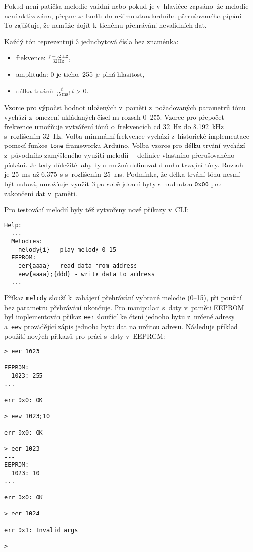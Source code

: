 Pokud není patička melodie validní nebo pokud je v~hlavičce zapsáno, že melodie
není aktivována, přepne se budík do režimu standardního přerušovaného pípání.
To zajišťuje, že nemůže dojít k~tichému přehrávání nevalidních dat.

Každý tón reprezentují 3 jednobytová čísla bez znaménka:
\begin{itemize}[nosep]
    \item frekvence: $\frac{f - \SI{32}{\hertz}}{\SI{32}{\hertz}}$,
    \item amplituda: \num{0} je ticho, \num{255} je plná hlasitost,
    \item délka trvání: $\frac{t}{\SI{25}{\milli\second}}; t > 0$.
\end{itemize}

Vzorce pro výpočet hodnot uložených v~paměti z~požadovaných parametrů tónu
vychází z~omezení ukládaných čísel na rozsah \numrange{0}{255}.
Vzorec pro přepočet frekvence umožňuje vytváření tónů o~frekvencích od
\SI{32}{\hertz} do \SI{8,192}{\kilo\hertz} s~rozlišením \SI{32}{\hertz}.
Volba minimální frekvence vychází z~historické implementace pomocí funkce
\verb|tone| frameworku Arduino. Volba vzorce pro délku trvání vychází
z~původního zamýšleného využití melodií~-- definice vlastního přerušovaného
pískání. Je tedy důležité, aby bylo možné definovat dlouho trvající tóny.
Rozsah je \SI{25}{\milli\second} až \SI{6,375}{\second} s~rozlišením
\SI{25}{\milli\second}. Podmínka, že délka trvání tónu nesmí být nulová,
umožňuje využít 3 po sobě jdoucí byty s~hodnotou \texttt{0x00} pro zakončení
dat v~paměti.

\pagebreak%
Pro testování melodií byly též vytvořeny nové příkazy v~CLI:
\begin{lstlisting}[style=terminal]
Help:
  ...
  Melodies:
    melody{i} - play melody 0-15
  EEPROM:
    eer{aaaa} - read data from address
    eew{aaaa};{ddd} - write data to address
  ...
\end{lstlisting}

Příkaz \verb|melody| slouží k~zahájení přehrávání vybrané melodie
(\numrange{0}{15}), při použití bez parametru přehrávání ukončuje.
Pro manipulaci s~daty v~paměti EEPROM byl implementován příkaz
\verb|eer| sloužící ke čtení jednoho bytu z~určené adresy a~\verb|eew|
provádějící zápis jednoho bytu dat na určitou adresu. Následuje příklad použití
nových příkazů pro práci s~daty v~EEPROM:
\begin{lstlisting}[style=terminal]
> eer 1023
---
EEPROM:
  1023: 255
...

err 0x0: OK

> eew 1023;10

err 0x0: OK

> eer 1023
---
EEPROM:
  1023: 10
...

err 0x0: OK

> eer 1024

err 0x1: Invalid args

>
\end{lstlisting}

